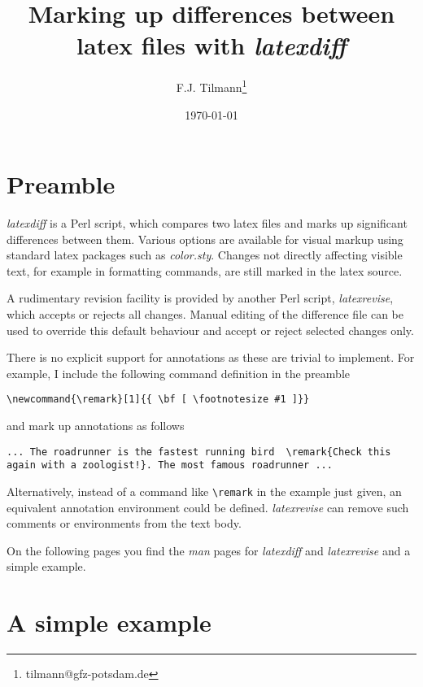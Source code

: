 \documentclass[a4]{article}
\title{Marking up differences between latex files with {\em latexdiff}}
\author{F.J. Tilmann\thanks{tilmann@gfz-potsdam.de}}
\date{\today}
\begin{document}
\maketitle

\section*{Preamble}

{\em latexdiff} is a Perl script, which compares two
latex files and marks up significant differences between them.  Various options are available for visual markup using standard
latex packages such as {\em color.sty}. Changes not directly affecting visible
text, for example in formatting  commands, are still marked in the
latex source.

A rudimentary revision facility is provided by another Perl script,
{\em latexrevise}, which  accepts or rejects all changes.  Manual editing
of the difference file can be used to override this default behaviour
and accept or reject selected changes only.  

There is no explicit support for annotations as these are trivial to implement.
For example, I include the following command definition in the preamble
\begin{verbatim}
\newcommand{\remark}[1]{{ \bf [ \footnotesize #1 ]}}
\end{verbatim}
and mark up annotations as follows 
\begin{verbatim}
... The roadrunner is the fastest running bird  \remark{Check this 
again with a zoologist!}. The most famous roadrunner ...
\end{verbatim}
Alternatively, instead of a command like \verb#\remark# in the example just given, an
equivalent annotation environment could be defined.
{\em latexrevise} can  remove such comments or
environments from the text body.


On the following pages you find  the {\em man} pages for {\em
  latexdiff} and {\em latexrevise} and a simple example.


\setcounter{section}{0}


\setcounter{section}{0}


\setcounter{section}{0}

\section*{A simple example}
\end{document}
